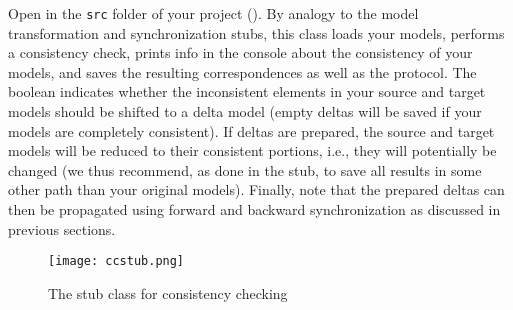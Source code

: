 Open  in the \texttt{src} folder of your project ().
By analogy to the model transformation and synchronization stubs, this class loads your models, performs a consistency check, prints info in the console about the consistency of your models, and saves the resulting correspondences as well as the protocol.
The boolean  indicates whether the inconsistent elements in your source and target models should be shifted to a delta model (empty deltas will be saved if your models are completely consistent).
If deltas are prepared, the source and target models will be reduced to their consistent portions, i.e., they will potentially be changed (we thus recommend, as done in the stub, to save all results in some other path than your original models).
Finally, note that the prepared deltas can then be propagated using forward and backward synchronization as discussed in previous sections.

\begin{figure}[htbp]
\renewcommand\figurename{Figure}
\begin{center}
\texttt{[image: ccstub.png]}
\caption{The stub class for consistency checking}
\label{eclipse:ccstub}
\end{center}
\end{figure}

